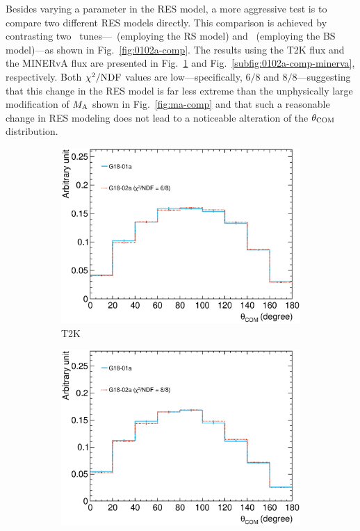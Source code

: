     Besides varying a parameter in the RES model, a more aggressive test is to compare two different RES models directly.
     This comparison is achieved by contrasting two \genie\ tunes—\geoa\ (employing the RS model) and \getwoa\ (employing the BS model)—as shown in Fig.~\ref{fig:0102a-comp}.
     The results using the T2K flux and the MINERvA flux are presented in Fig.~\ref{subfig:0102a-comp-t2k} and Fig.~\ref{subfig:0102a-comp-minerva}, respectively.
     Both $\chi^2/{\textrm{NDF}}$ values are low—specifically, $6/8$ and $8/8$—suggesting that this change in the RES model is far less extreme than the unphysically large modification of $M_{\textrm{A}}$ shown in Fig.~\ref{fig:ma-comp} and that such a reasonable change in RES modeling does not lead to a noticeable alteration of the $\theta_{\textrm{COM}}$ distribution.
     \begin{figure}
     \centering
     \begin{subfigure}[b]{\dbfigwid\textwidth}
          \centering
          \includegraphics[width=\textwidth]{figures/COM/anorm-01a-02a_da_tan.eps}
          \caption{T2K}
          \label{subfig:0102a-comp-t2k}
     \end{subfigure}
     \begin{subfigure}[b]{\dbfigwid\textwidth}
          \centering
          \includegraphics[width=\textwidth]{figures/COM/anorm-01a-02a-minerva_da_tan.eps}

\end{subfigure}
\end{figure}
